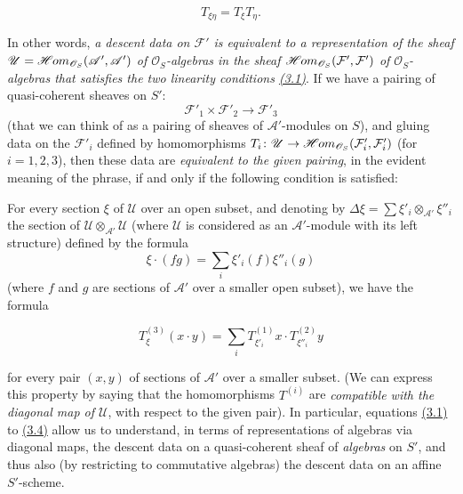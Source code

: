 \documentclass{article}
\newcommand{\oldpage}[1]{\marginpar{\footnotesize$\Big\vert$ \textit{p.~#1}}}
\theoremstyle{definition}
\theoremstyle{definition}
\theoremstyle{definition}
\theoremstyle{definition}
\theoremstyle{remark}
\begin{document}
\leavevmode{}%
\[
  T_{\xi\eta} = T_\xi T_\eta.
\tag{3.3}
\]

In other words, \emph{a descent data on \({\mathcal{F}}'\) is equivalent to a representation of the sheaf \({\mathscr{U}}=\mathscr{H}\kern -.5pt om_{{\mathscr{O}}_S}({\mathscr{A}}',{\mathscr{A}}')\) of \({\mathscr{O}}_S\)-algebras in the sheaf \(\mathscr{H}\kern -.5pt om_{{\mathscr{O}}_S}({\mathcal{F}}',{\mathcal{F}}')\) of \({\mathscr{O}}_S\)-algebras that satisfies the two linearity conditions \protect\hyperlink{fga-3-i-section-B.3-equation-3.1}{(3.1)}}.
If we have a pairing of quasi-coherent sheaves on \(S'\):
\[
  {\mathcal{F}}'_1\times{\mathcal{F}}'_2 \to {\mathcal{F}}'_3
\]
\oldpage{190-22}(that we can think of as a pairing of sheaves of \({\mathscr{A}}'\)-modules on \(S\)), and gluing data on the \({\mathcal{F}}'_i\) defined by homomorphisms \(T_i\colon{\mathscr{U}}\to\mathscr{H}\kern -.5pt om_{{\mathscr{O}}_S}({\mathcal{F}}'_i,{\mathcal{F}}'_i)\) (for \(i=1,2,3\)), then these data are \emph{equivalent to the given pairing}, in the evident meaning of the phrase, if and only if the following condition is satisfied:

For every section \(\xi\) of \({\mathscr{U}}\) over an open subset, and denoting by \(\Delta\xi=\sum\xi'_i\otimes_{{\mathscr{A}}'}\xi''_i\) the section of \({\mathscr{U}}\otimes_{{\mathscr{A}}'}{\mathscr{U}}\) (where \({\mathscr{U}}\) is considered as an \({\mathscr{A}}'\)-module with its left structure) defined by the formula
\[
  \xi\cdot(fg) = \sum_i\xi'_i(f)\xi''_i(g)
\]
(where \(f\) and \(g\) are sections of \({\mathscr{A}}'\) over a smaller open subset), we have the formula

\leavevmode{}%
\[
  T_\xi^{(3)}(x\cdot y) = \sum_i T_{\xi'_i}^{(1)}x\cdot T_{\xi''_i}^{(2)}y
\tag{3.4}
\]

for every pair \((x,y)\) of sections of \({\mathscr{A}}'\) over a smaller subset.
(We can express this property by saying that the homomorphisms \(T^{(i)}\) are \emph{compatible with the diagonal map of \({\mathscr{U}}\)}, with respect to the given pair).
In particular, equations \protect\hyperlink{fga-3-i-section-B.3-equation-3.1}{(3.1)} to \protect\hyperlink{fga-3-i-section-B.3-equation-3.4}{(3.4)} allow us to understand, in terms of representations of algebras via diagonal maps, the descent data on a quasi-coherent sheaf of \emph{algebras} on \(S'\), and thus also (by restricting to commutative algebras) the descent data on an affine \(S'\)-scheme.
\end{document}
